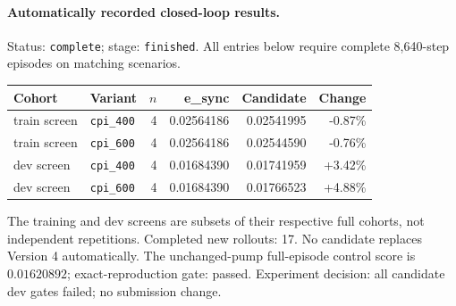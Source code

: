 \paragraph{Automatically recorded closed-loop results.}
Status: \texttt{complete}; stage: \texttt{finished}.
All entries below require complete 8,640-step episodes on matching scenarios.
\begin{center}\small
\begin{tabular}{llrrrr}\toprule
Cohort & Variant & $n$ & e\_sync & Candidate & Change \\\midrule
train screen & \texttt{cpi\_400} & 4 & 0.02564186 & 0.02541995 & -0.87\% \\
train screen & \texttt{cpi\_600} & 4 & 0.02564186 & 0.02544590 & -0.76\% \\
dev screen & \texttt{cpi\_400} & 4 & 0.01684390 & 0.01741959 & +3.42\% \\
dev screen & \texttt{cpi\_600} & 4 & 0.01684390 & 0.01766523 & +4.88\% \\
\bottomrule\end{tabular}\end{center}
The training and dev screens are subsets of their respective full cohorts, not independent repetitions.
Completed new rollouts: 17. No candidate replaces Version 4 automatically.
The unchanged-pump full-episode control score is $0.01620892$; exact-reproduction gate: passed.
Experiment decision: all candidate dev gates failed; no submission change.
